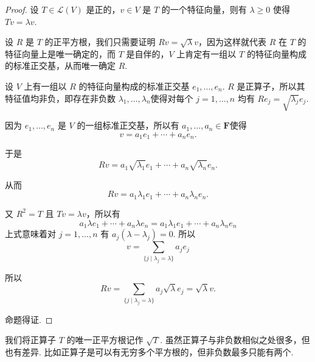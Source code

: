 \begin{proof}
    设 $ T \in \mathcal{L}(V) $ 是正的，$ v \in V $ 是 $ T $ 的一个特征向量，则有 $ \lambda \geqslant 0 $ 使得 $ Tv = \lambda v $.

    设 $ R $ 是 $ T $ 的正平方根，我们只需要证明 $ Rv = \sqrt{\lambda} v $，因为这样就代表 $ R $ 在 $ T $ 的特征向量上是唯一确定的，而 $ T $ 是自伴的，$ V $ 上肯定有一组以 $ T $ 的特征向量构成的标准正交基，从而唯一确定 $ R $.

    设 $ V $ 上有一组以 $ R $ 的特征向量构成的标准正交基 $ e_1, \ldots , e_n $. $ R $ 是正算子，所以其特征值均非负，即存在非负数 $\lambda_1, \ldots , \lambda_n $使得对每个 $ j = 1, \ldots , n $ 均有 $ Re_j = \sqrt{\lambda_j}e_j $.

    因为 $ e_1, \ldots , e_n $ 是 $ V $ 的一组标准正交基，所以有 $ a_1, \ldots , a_n \in \mathbf{F} $使得
    \[ v = a_1e_1 + \cdots + a_ne_n. \]

    于是
    \[ Rv = a_1\sqrt{\lambda_1}e_1 + \cdots + a_n\sqrt{\lambda_n}e_n. \]

    从而
    \[ Rv = a_1\lambda_1e_1 + \cdots + a_n\lambda_ne_n. \]

    又 $ R^{2} = T $ 且 $ Tv = \lambda v $，所以有
    \[ a_1\lambda e_1 + \cdots + a_n\lambda e_n = a_1\lambda_1e_1 + \cdots + a_n\lambda_ne_n \]
    上式意味着对 $ j = 1, \ldots, n $ 有 $ a_j(\lambda - \lambda_j) = 0 $. 所以
    \[ v = \sum_{\{j \mid \lambda_j = \lambda \}} a_je_j \]

    所以
    \[ Rv = \sum_{\{j \mid \lambda_j = \lambda \}} a_j\sqrt{\lambda}e_j = \sqrt{\lambda}v. \]

    命题得证.
\end{proof}

我们将正算子 $ T $ 的唯一正平方根记作 $ \sqrt{T} $. 虽然正算子与非负数相似之处很多，但也有差异. 比如正算子是可以有无穷多个平方根的，但非负数最多只能有两个.




